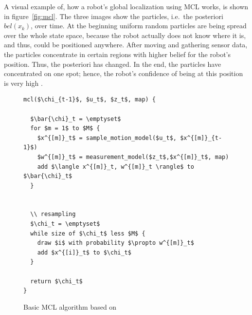 A visual example of, how a robot's global localization using \acs{MCL} works, is shown in figure~\ref{fig:mcl}. The three images show the particles, i.e.\ the posteriori $bel(x_k)$, over time. At the beginning uniform random particles are being spread over the whole state space, because the robot actually does not know where it is, and thus, could be positioned anywhere. After moving and gathering sensor data, the particles concentrate in certain regions with higher belief for the robot's position. Thus, the posteriori has changed. In the end, the particles have concentrated on one spot; hence, the robot's confidence of being at this position is very high \citep{thrun:prob_robo}.

\begin{figure}
\begin{lstlisting}[mathescape]
mcl($\chi_{t-1}$, $u_t$, $z_t$, map) {

  $\bar{\chi}_t = \emptyset$
  for $m = 1$ to $M$ {
    $x^{[m]}_t$ = sample_motion_model($u_t$, $x^{[m]}_{t-1}$)
    $w^{[m]}_t$ = measurement_model($z_t$,$x^{[m]}_t$, map)
    add $\langle x^{[m]}_t, w^{[m]}_t \rangle$ to $\bar{\chi}_t$
  }
  
  
  \\ resampling
  $\chi_t = \emptyset$
  while size of $\chi_t$ less $M$ {
    draw $i$ with probability $\propto w^{[m]}_t$
    add $x^{[i]}_t$ to $\chi_t$
  }
  
  return $\chi_t$
}
\end{lstlisting}
\caption{Basic \acl{MCL} algorithm based on \citet{thrun:prob_robo}}
\label{lst:mcl}
\end{figure}



